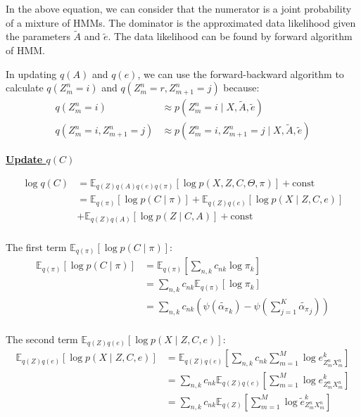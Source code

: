 \documentclass[12pt]{article}
\newenvironment{problem}[2][Problem]{\begin{trivlist}
\item[\hskip \labelsep {\bfseries #1}\hskip \labelsep {\bfseries #2.}]}{\end{trivlist}}
\begin{document}
\begin{problem}{2.8.24}
In the above equation, we can consider that the numerator is a joint probability of
a mixture of HMMs. The dominator is the approximated data likelihood given 
the parameters $\tilde{A}$ and $\tilde{e}$.
The data likelihood can be found by forward algorithm of HMM. 

In updating $q(A)$ and $q(e)$, we can use 
the forward-backward algorithm to calculate $q(Z^n_{m}=i)$ and $q(Z^n_{m}=r, Z^n_{m+1}=j)$
because:
\begin{align*}
    q(Z^n_{m}=i) &\approx p(Z^n_{m}=i \mid X, \tilde{A}, \tilde{e}) \\
    q(Z^n_{m}=i, Z^n_{m+1}=j) &\approx p(Z^n_{m}=i, Z^n_{m+1}=j\mid X, \tilde{A}, \tilde{e})
\end{align*}

\begin{flushleft}
    \textbf{\underline{Update $q(C)$}}
\end{flushleft}
\begin{align*}
    \log q(C) &= \mathbb{E}_{q(Z)q(A)q(e)q(\pi)}[\log p(X, Z, C, \Theta, \pi)] + \text{const} \\
    &= \mathbb{E}_{q(\pi)}[\log p(C \mid \pi)]
        + \mathbb{E}_{q(Z)q(e)}[\log p(X \mid Z, C, e)]  \\
        &+ \mathbb{E}_{q(Z)q(A)}[\log p(Z \mid C, A)] + \text{const} \\
\end{align*}

The first term $\mathbb{E}_{q(\pi)}[\log p(C \mid \pi)]$:
\begin{align*}
    \mathbb{E}_{q(\pi)}[\log p(C \mid \pi)] 
    &= \mathbb{E}_{q(\pi)}[\sum_{n,k} c_{nk} \log \pi_k] \\
    &= \sum_{n,k} c_{nk}\mathbb{E}_{q(\pi)}[\log \pi_k] \\
    &= \sum_{n,k} c_{nk}(\psi(\tilde{\alpha_\pi}_k) - \psi(\sum_{j=1}^{K}\tilde{\alpha_\pi}_j)) \\
\end{align*}

The second term $\mathbb{E}_{q(Z)q(e)}[\log p(X \mid Z, C, e)]$:
\begin{align*}
    \mathbb{E}_{q(Z)q(e)}[\log p(X \mid Z, C, e)]
    &= \mathbb{E}_{q(Z)q(e)}[\sum_{n,k}c_{nk}\sum_{m=1}^{M}\log e^k_{Z^n_m X^n_m}] \\
    &= \sum_{n,k}c_{nk}\mathbb{E}_{q(Z)q(e)}[\sum_{m=1}^{M}\log e^k_{Z^n_m X^n_m}] \\
    &= \sum_{n,k}c_{nk}\mathbb{E}_{q(Z)}[\sum_{m=1}^{M}\log \tilde{e}^k_{Z^n_m X^n_m}]
\end{align*}


\end{problem}
\end{document}
